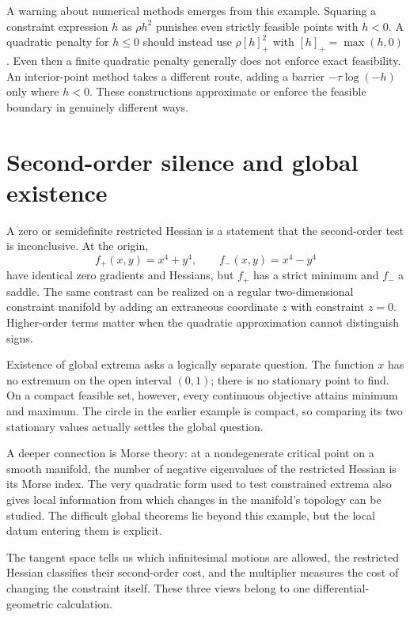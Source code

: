 A warning about numerical methods emerges from this example. Squaring a constraint expression $h$ as $\rho h^2$ punishes even strictly feasible points with $h<0$. A quadratic penalty for $h\le0$ should instead use $\rho[h]_+^2$ with $[h]_+=\max(h,0)$. Even then a finite quadratic penalty generally does not enforce exact feasibility. An interior-point method takes a different route, adding a barrier $-\tau\log(-h)$ only where $h<0$. These constructions approximate or enforce the feasible boundary in genuinely different ways.

\section{Second-order silence and global existence}

A zero or semidefinite restricted Hessian is a statement that the second-order test is inconclusive. At the origin,
\[
 f_+(x,y)=x^4+y^4,\qquad f_-(x,y)=x^4-y^4
\]
have identical zero gradients and Hessians, but $f_+$ has a strict minimum and $f_-$ a saddle. The same contrast can be realized on a regular two-dimensional constraint manifold by adding an extraneous coordinate $z$ with constraint $z=0$. Higher-order terms matter when the quadratic approximation cannot distinguish signs.

Existence of global extrema asks a logically separate question. The function $x$ has no extremum on the open interval $(0,1)$; there is no stationary point to find. On a compact feasible set, however, every continuous objective attains minimum and maximum. The circle in the earlier example is compact, so comparing its two stationary values actually settles the global question.

A deeper connection is Morse theory: at a nondegenerate critical point on a smooth manifold, the number of negative eigenvalues of the restricted Hessian is its Morse index. The very quadratic form used to test constrained extrema also gives local information from which changes in the manifold's topology can be studied. The difficult global theorems lie beyond this example, but the local datum entering them is explicit.

The tangent space tells us which infinitesimal motions are allowed, the restricted Hessian classifies their second-order cost, and the multiplier measures the cost of changing the constraint itself. These three views belong to one differential-geometric calculation.

